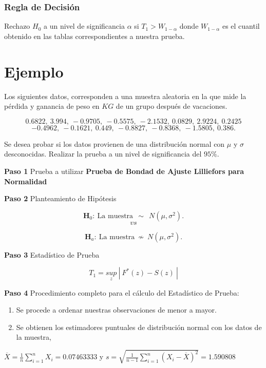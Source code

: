 \documentclass[
  a4paper,
  oneside,
  openany]{book}
\begin{document}
\hypertarget{regla-de-decisiuxf3n-32}{%
\subsubsection*{Regla de Decisión}\label{regla-de-decisiuxf3n-32}}


Rechazo \(H_0\) a un nivel de significancia \(\alpha\) si \(T_{1}> W_{1-\alpha}\) donde \(W_{1-\alpha}\) es el cuantil obtenido en las tablas correspondientes a nuestra prueba.

\hypertarget{ejemplo-14}{%
\section{Ejemplo}\label{ejemplo-14}}

Los siguientes datos, corresponden a una muestra aleatoria en la que mide la pérdida y ganancia de peso en \(KG\) de un grupo después de vacaciones.

\[0.6822,\ 3.994,\ -0.9705,\ -0.5575,\ -2.1532,\ 0.0829,\ 2.9224,\ 0.2425\]
\[-0.4962,\ -0.1621,\ 0.449,\ -0.8827,\ -0.8368,\ -1.5805,\ 0.386.\]

Se desea probar si los datos provienen de una distribución normal con \(\mu\) y \(\sigma\) desconocidas.
Realizar la prueba a un nivel de significancia del \(95\%.\)

\textbf{Paso 1} Prueba a utilizar \textbf{Prueba de Bondad de Ajuste Lilliefors para Normalidad}

\textbf{Paso 2} Planteamiento de Hipótesis

\[\textbf{H}_0: \ \mbox{La muestra} \ \ \sim \ \  N(\mu,\sigma^2).\]
\[vs\]

\[\textbf{H}_a: \ \mbox{La muestra}  \ \nsim \  N(\mu,\sigma^2).\]

\textbf{Paso 3} Estadístico de Prueba

\[T_{1}=\underset{z}{sup} \ | \ F^*(z)-S(z) \ |\]

\textbf{Paso 4} Procedimiento completo para el cálculo del Estadístico de Prueba:

\begin{enumerate}
\def\labelenumi{\arabic{enumi})}
\item
  Se procede a ordenar nuestras observaciones de menor a mayor.
\item
  Se obtienen los estimadores puntuales de distribución normal con los datos de la muestra,
\end{enumerate}

\(\overline{X}=\frac{1}{n}\sum_{i=1}^{n}X_{i}= 0.07463333\) y \(s=\sqrt{\frac{1}{n-1}\sum_{i=1}^{n}(X_{i}-\overline{X})^2}=1.590808\)
\end{document}
